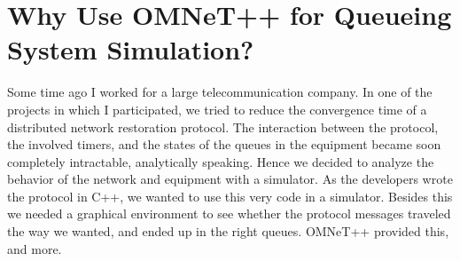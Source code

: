\documentclass[a4paper]{article}
\begin{document}
\section{Why Use OMNeT++ for Queueing System Simulation?}
\label{sec:why-use-omnet++}
Some time ago I worked for a large telecommunication company. In one
of the projects in which I participated, we tried to reduce the
convergence time of a distributed network restoration protocol. The
interaction between the protocol, the involved timers, and the states
of the queues in the equipment became soon completely intractable,
analytically speaking.  Hence we decided to analyze the behavior of
the network and equipment with a simulator. As the developers wrote
the protocol in C++, we wanted to use this very code in a simulator.
Besides this we needed a graphical environment to see whether the
protocol messages traveled the way we wanted, and ended up in the
right queues. OMNeT++ provided this, and more.
\end{document}
